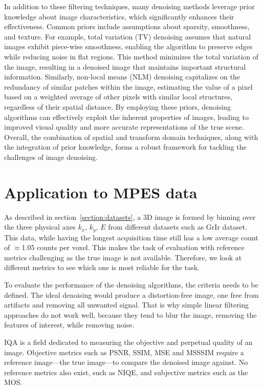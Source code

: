 In addition to these filtering techniques, many denoising methods leverage prior knowledge about image characteristics, which significantly enhances their effectiveness. Common priors include assumptions about sparsity, smoothness, and texture. For example, total variation (TV) denoising assumes that natural images exhibit piece-wise smoothness, enabling the algorithm to preserve edges while reducing noise in flat regions. This method minimizes the total variation of the image, resulting in a denoised image that maintains important structural information. Similarly, non-local means (NLM) denoising capitalizes on the redundancy of similar patches within the image, estimating the value of a pixel based on a weighted average of other pixels with similar local structures, regardless of their spatial distance. By employing these priors, denoising algorithms can effectively exploit the inherent properties of images, leading to improved visual quality and more accurate representations of the true scene. Overall, the combination of spatial and transform domain techniques, along with the integration of prior knowledge, forms a robust framework for tackling the challenges of image denoising.


\section{Application to MPES data}
As described in section~\ref{section:datasets}, a 3D image is formed by binning over the three physical axes $k_x$, $k_y$, $E$ from different datasets such as \gls{GrIr} dataset. This data, while having the longest acquisition time still has a low average count of $\approx$1.05 counts per voxel. This makes the task of evaluation with reference metrics challenging as the true image is not available. Therefore, we look at different metrics to see which one is most reliable for the task.

To evaluate the performance of the denoising algorithms, the criteria needs to be defined. The ideal denoising would produce a distortion-free image, one free from artifacts and removing all unwanted signal. That is why simple linear filtering approaches do not work well, because they tend to blur the image, removing the features of interest, while removing noise.

\gls{IQA} is a field dedicated to measuring the objective and perpetual quality of an image. Objective metrics such as \gls{PSNR}, \gls{SSIM}, \gls{MSE} and \gls{MSSSIM} require a reference image---the true image---to compare the denoised image against. No reference metrics also exist, such as \gls{NIQE}, and subjective metrics such as the \gls{MOS}.

